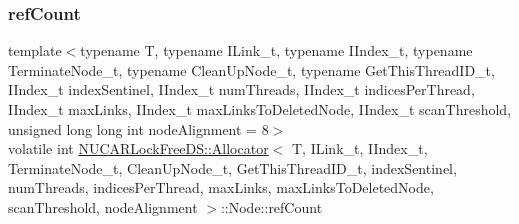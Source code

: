 \mbox{\label{class_n_u_c_a_r_lock_free_d_s_1_1_allocator_1_1_node_a312678ef69212305fcb1a502487ecbf0}} 
\subsubsection{\texorpdfstring{ref\+Count}{refCount}}
{\footnotesize\ttfamily template$<$typename T, typename I\+Link\+\_\+t, typename I\+Index\+\_\+t, typename Terminate\+Node\+\_\+t, typename Clean\+Up\+Node\+\_\+t, typename Get\+This\+Thread\+I\+D\+\_\+t, I\+Index\+\_\+t index\+Sentinel, I\+Index\+\_\+t num\+Threads, I\+Index\+\_\+t indices\+Per\+Thread, I\+Index\+\_\+t max\+Links, I\+Index\+\_\+t max\+Links\+To\+Deleted\+Node, I\+Index\+\_\+t scan\+Threshold, unsigned long long int node\+Alignment = 8$>$ \\
volatile int \mbox{\hyperlink{class_n_u_c_a_r_lock_free_d_s_1_1_allocator}{N\+U\+C\+A\+R\+Lock\+Free\+D\+S\+::\+Allocator}}$<$ T, I\+Link\+\_\+t, I\+Index\+\_\+t, Terminate\+Node\+\_\+t, Clean\+Up\+Node\+\_\+t, Get\+This\+Thread\+I\+D\+\_\+t, index\+Sentinel, num\+Threads, indices\+Per\+Thread, max\+Links, max\+Links\+To\+Deleted\+Node, scan\+Threshold, node\+Alignment $>$\+::Node\+::ref\+Count\hspace{0.3cm}{\ttfamily [private]}}

\mbox{\label{class_n_u_c_a_r_lock_free_d_s_1_1_allocator_1_1_node_a2f124c812c1bff924eb839a4dcd372b8}} 
